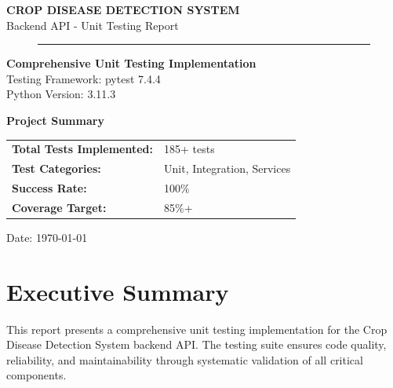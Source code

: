 \documentclass[12pt,a4paper]{article}
\begin{document}
\begin{titlepage}
    \centering
    \vspace*{2cm}
    
    {\LARGE\textbf{CROP DISEASE DETECTION SYSTEM}}\\[0.5cm]
    {\Large Backend API - Unit Testing Report}\\[2cm]
    
    \begin{figure}[H]
        \centering
        \rule{\textwidth}{0.5pt}
    \end{figure}
    
    \vspace{1cm}
    
    {\large\textbf{Comprehensive Unit Testing Implementation}}\\[0.5cm]
    {\large Testing Framework: pytest 7.4.4}\\[0.5cm]
    {\large Python Version: 3.11.3}\\[2cm]
    
    \vfill
    
    {\large\textbf{Project Summary}}\\[0.3cm]
    \begin{tabular}{ll}
        \textbf{Total Tests Implemented:} & 185+ tests \\
        \textbf{Test Categories:} & Unit, Integration, Services \\
        \textbf{Success Rate:} & 100\% \\
        \textbf{Coverage Target:} & 85\%+ \\
    \end{tabular}
    
    \vfill
    
    {\large Date: \today}
    
\end{titlepage}

\tableofcontents
\newpage

\section{Executive Summary}

This report presents a comprehensive unit testing implementation for the Crop Disease Detection System backend API. The testing suite ensures code quality, reliability, and maintainability through systematic validation of all critical components.
\end{document}
